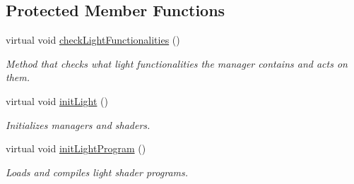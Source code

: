 \subsection*{Protected Member Functions}
\begin{DoxyCompactItemize}
\item 
\mbox{\label{class_geometry_engine_1_1_geometry_world_item_1_1_geometry_light_1_1_light_a69cf905dac6615d6dd0bde965e5dea31}} 
virtual void \mbox{\hyperlink{class_geometry_engine_1_1_geometry_world_item_1_1_geometry_light_1_1_light_a69cf905dac6615d6dd0bde965e5dea31}{check\+Light\+Functionalities}} ()
\begin{DoxyCompactList}\small\item\em Method that checks what light functionalities the manager contains and acts on them. \end{DoxyCompactList}\item 
\mbox{\label{class_geometry_engine_1_1_geometry_world_item_1_1_geometry_light_1_1_light_ab3be1e49344f033c893120a3de792b46}} 
virtual void \mbox{\hyperlink{class_geometry_engine_1_1_geometry_world_item_1_1_geometry_light_1_1_light_ab3be1e49344f033c893120a3de792b46}{init\+Light}} ()
\begin{DoxyCompactList}\small\item\em Initializes managers and shaders. \end{DoxyCompactList}\item 
\mbox{\label{class_geometry_engine_1_1_geometry_world_item_1_1_geometry_light_1_1_light_a199c45f95482b66a0b5b45c5fdecb2e7}} 
virtual void \mbox{\hyperlink{class_geometry_engine_1_1_geometry_world_item_1_1_geometry_light_1_1_light_a199c45f95482b66a0b5b45c5fdecb2e7}{init\+Light\+Program}} ()
\begin{DoxyCompactList}\small\item\em Loads and compiles light shader programs. \end{DoxyCompactList}\item 
\mbox{\label{class_geometry_engine_1_1_geometry_world_item_1_1_geometry_light_1_1_light_a7bcd2133b4b691496691148e73c5411b}} 

\end{DoxyCompactItemize}
